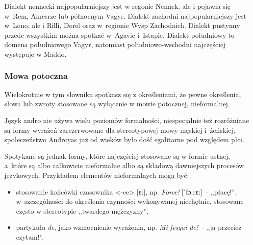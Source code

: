 \begin{spacing}{1.1}
Dialekt nennecki najpopularniejszy jest w regonie Nennek, ale i pojawia się
w~Rem, Amesrze lub północnym Vagyr. Dialekt zachodni najpopularniejszy jest
w~Lono, ale i Rilli, Dorel oraz w~regionie Wysp Zachodnich. Dialekt pustynny
przede wszystkim można spotkać w~Agavie i~Istapie. Dialekt południowy to domena
południowego Vagyr, natomiast południowo-wschodni najczęściej występuje w Maddo.

\subsubsection{Mowa potoczna}

Wielokrotnie w tym słowniku spotkasz się z określeniami, że pewne określenia,
słowa lub zwroty stosowane są wyłącznie w mowie potocznej, nieformalnej.

Język andro nie używa wielu poziomów formalności, niespecjalnie też rozróżniane
są formy wyrażeń zarezerwowane dla stereotypowej mowy męskiej i~żeńskiej,
społeczeństwo And́royas już od wieków było dość egalitarne pod względem płci.

Spotykane są jednak formy, które najczęściej stosowane są w formie ustnej,
a~które są albo całkowicie nieformalne albo są składową dawniejszych procesów
językowych. Przykładem elementów nieformalnych mogą być:

\begin{itemize}
	\item stosowanie końcówki czasownika <-ee> [ɛ:], np. \emph{Foree!} [ˈfɔ.rɛ:]
	-- ,,płacę!'', w~szczególności do określenia czynności wykonywanej
	niechętnie, stosowane często w stereotypie ,,twardego mężczyzny'',
	\item partykuła \emph{de}, jako wzmocnienie wyrażenia, np. \emph{Mi fesgai
	de!} -- ,,ja przecież czytam!''.
\end{itemize}

\end{spacing}